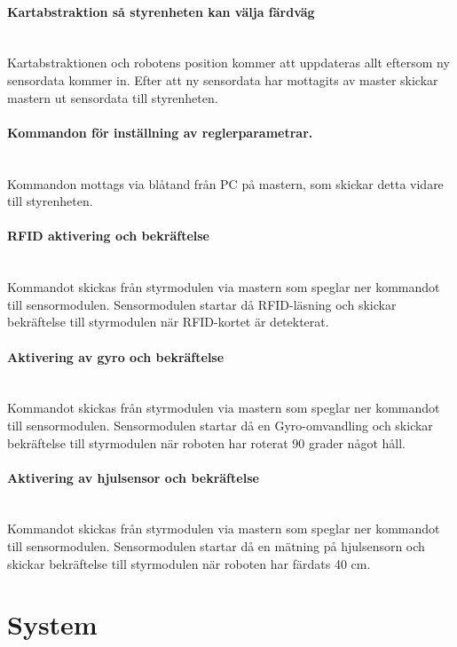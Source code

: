 \documentclass[a4paper,12pt,fleqn]{article}
\begin{document}
\paragraph{Kartabstraktion så styrenheten kan välja färdväg}
~\\
Kartabstraktionen och robotens position kommer att uppdateras allt eftersom ny sensordata kommer in. Efter att ny sensordata har mottagits av master skickar mastern ut sensordata till styrenheten.
\paragraph{Kommandon för inställning av reglerparametrar.}
~\\
Kommandon mottags via blåtand från PC på mastern, som skickar detta vidare till styrenheten. 
\paragraph{RFID aktivering och bekräftelse}
~\\
Kommandot skickas från styrmodulen via mastern som speglar ner kommandot till sensormodulen. Sensormodulen startar då RFID-läsning och skickar bekräftelse till styrmodulen när RFID-kortet är detekterat.  

\paragraph{Aktivering av gyro och bekräftelse}
~\\
Kommandot skickas från styrmodulen via mastern som speglar ner kommandot till sensormodulen. Sensormodulen startar då en Gyro-omvandling och skickar bekräftelse till styrmodulen när roboten har roterat 90 grader något håll. 

\paragraph{Aktivering av hjulsensor och bekräftelse}
~\\
Kommandot skickas från styrmodulen via mastern som speglar ner kommandot till sensormodulen. Sensormodulen startar då en mätning på hjulsensorn och skickar bekräftelse till styrmodulen när roboten har färdats 40 cm. 




\newpage
\section{System}
\end{document}
